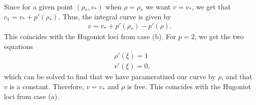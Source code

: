 \documentclass{article}
\begin{document}
Since for a given point $(\rho_*, v_*)$ when $\rho = \rho_*$ we want 
$v = v_*$, we get that $c_1 = v_* + p'(\rho_*)$. Thus, the integral curve 
is given by 
\begin{align*}
v = v_* + p'(\rho_*) - p'(\rho ).
\end{align*}
This coincides with the Hugoniot loci from case (b). For $p = 2$, we get the 
two equations
\begin{align*}
&\rho'(\xi ) = 1 \\
&v'(\xi ) = 0,
\end{align*}
which can be solved to find that we have parameratized our curve by $\rho$, 
and that $v$ is a constant. Therefore, $v = v_*$ and $\rho$ is free. 
This coincides with the Hugoniot loci from case (a).

\begin{figure}[h!]
 \centering
\end{figure}
\end{document}
